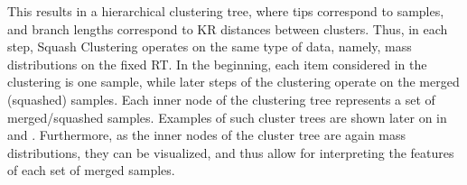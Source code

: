 This results in a hierarchical clustering tree, where tips correspond to samples,
and branch lengths correspond to KR distances between clusters.
Thus, in each step, Squash Clustering operates on the same type of data, namely, mass distributions on the fixed \ac{RT}.
In the beginning, each item considered in the clustering is one sample,
while later steps of the clustering operate on the merged (squashed) samples.
Each inner node of the clustering tree represents a set of merged/squashed samples.
Examples of such cluster trees are shown later on in  and .
Furthermore, as the inner nodes of the cluster tree are again mass distributions,
they can be visualized, and thus allow for interpreting the features of each set of merged samples.

